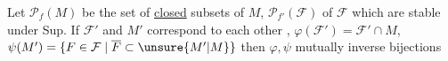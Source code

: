  Let $\mathcal P_f(M)$ be the set of \uline{closed} subsets of $M$, $\mathcal P_{f'}(\mathcal F)$ of $\mathcal F$ which are stable under Sup. If $\mathcal F'$ and $M'$ correspond to each other , 
$\varphi(\mathcal F')=\mathcal F'\cap M$, $\psi(M')=\{F\in\mathcal F\mid\overline F\subset \unsure{M'|M}\}$ then $\varphi,\psi$ mutually inverse bijections
